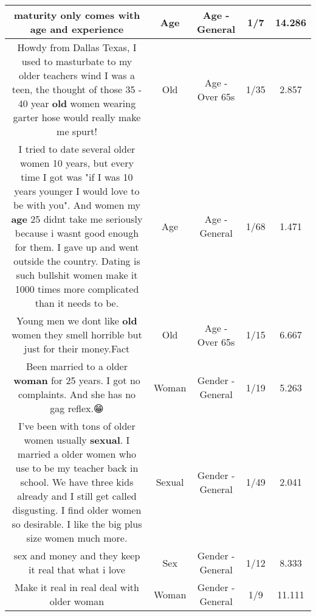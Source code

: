\documentclass[11pt]{article}
\newlength\mylength
\begin{document}
\begin{center}
\begin{longtable}{|C{.65\mylength}|C{.30\mylength}|C{.12\mylength}|C{.12\mylength}|C{.12\mylength}|}
  \small maturity only comes with \textbf{age} and experience\normalsize   & Age & Age - General & 1/7 & 14.286 \\  \hline
  \small Howdy from Dallas Texas, I used to masturbate to my older teachers wind I was a teen, the thought of those 35 - 40 year \textbf{old} women wearing garter hose would really make me spurt!\normalsize   & Old & Age - Over 65s & 1/35 & 2.857 \\  \hline
  \small I tried to date several older women  10 years, but every time I got was "if I was 10 years younger I would love to be with you". And women my \textbf{age} 25 didnt take me seriously because i wasnt good enough for them. I gave up and went outside the country. Dating is such bullshit women make it 1000 times more complicated than it needs to be.\normalsize   & Age & Age - General & 1/68 & 1.471 \\  \hline
  \small Young men we dont like \textbf{old} women they smell horrible but just for their money.Fact\normalsize   & Old & Age - Over 65s & 1/15 & 6.667 \\  \hline
  \small Been married to a older \textbf{woman} for 25 years. I got no complaints. And she has no gag reflex.😁\normalsize   & Woman & Gender - General & 1/19 & 5.263 \\  \hline
  \small I've been with tons of older women usually \textbf{sexual}. I married a older women who use to be my teacher back in school. We have three kids already and I still get called disgusting. I find older women so desirable. I like the big plus size women much more.\normalsize   & Sexual & Gender - General & 1/49 & 2.041 \\  \hline
  \small sex and money and they keep it real that what i love\normalsize   & Sex & Gender - General & 1/12 & 8.333 \\  \hline
  \small Make it real in real deal with older woman\normalsize   & Woman & Gender - General & 1/9 & 11.111 \\  \hline

\end{longtable}
\end{center}
\end{document}
